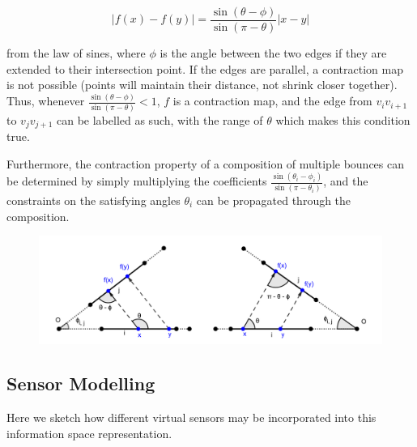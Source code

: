\documentclass[]{styles/svproc}  %
\begin{document}
\begin{equation*}
|f(x) - f(y)| = \frac{\sin(\theta - \phi)}{\sin(\pi-\theta)} |x-y|
\end{equation*}

from the law of sines, where $\phi$ is the angle between the two edges if they
are extended to their intersection point. If the edges are parallel, a
contraction map is not possible (points will maintain their distance, not shrink
closer together). Thus, whenever $\frac{\sin(\theta - \phi)}{\sin(\pi-\theta)}
< 1$, $f$ is a contraction map, and the edge from $v_i v_{i+1}$ to $v_j
v_{j+1}$ can be labelled as such, with the range of $\theta$ which makes this
condition true.

Furthermore, the contraction property of a composition of multiple bounces can
be determined by simply multiplying the coefficients $\frac{\sin(\theta_i -
\phi_i)}{\sin(\pi-\theta_i)}$, and the constraints on the satisfying angles
$\theta_i$ can be propagated through the composition.

\begin{figure}
    \includegraphics[width=0.8\linewidth]{figures/contraction_map_cond.png}
    \centering
    \caption{\label{fig:cont_map}}
\end{figure}

\subsection{Sensor Modelling}

Here we sketch how different virtual sensors may be incorporated into this
information space representation.
\end{document}
